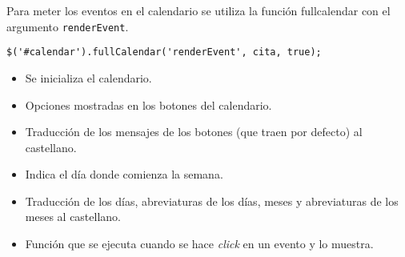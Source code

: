 Para meter los eventos en el calendario se utiliza la función fullcalendar con el argumento \texttt{renderEvent}.


\medskip
\begin{lstlisting}
$('#calendar').fullCalendar('renderEvent', cita, true);
\end{lstlisting}


\begin{itemize}
\item Se inicializa el calendario.
\item Opciones mostradas en los botones del calendario.
\item Traducción de los mensajes de los botones (que traen por defecto) al castellano.
\item Indica el día donde comienza la semana.
\item Traducción de los días, abreviaturas de los días, meses y abreviaturas de los meses al castellano.
\item Función que se ejecuta cuando se hace \textit{click} en un evento y lo muestra.
\end{itemize}